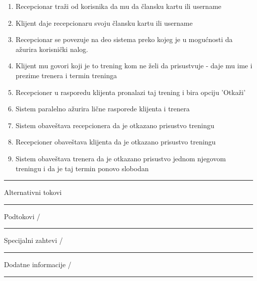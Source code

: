 \begin{center}
\begin{enumerate}
    \item Recepcionar traži od korisnika da mu da člansku kartu ili username
    \item Klijent daje recepcionaru svoju člansku kartu ili username
    \item Recepcionar se povezuje na deo sistema preko kojeg je u mogućnosti da ažurira korisnički nalog.
    \item Klijent mu govori koji je to trening kom ne želi da prisustvuje - daje mu ime i prezime trenera i termin treninga
    \item Recepcioner u rasporedu klijenta pronalazi taj trening i bira opciju 'Otkaži' 
    \item Sistem paralelno ažurira lične rasporede klijenta i trenera
    \item Sistem obaveštava recepcionera da je otkazano prisustvo treningu
    \item Recepcioner obaveštava klijenta da je otkazano prisustvo treningu
    \item Sistem obaveštava trenera da je otkazano prisustvo jednom njegovom treningu i da je taj termin ponovo slobodan
   \end{enumerate}
\hrule
\vspace{0.2cm}
    Alternativni tokovi  \\
\hrule
\vspace{0.2cm}
    Podtokovi  /\\
\hrule
\vspace{0.2cm}
    Specijalni zahtevi  /\\
\hrule
\vspace{0.2cm}
    Dodatne informacije  /\\
\hrule
\vspace{0.2cm}
    
    
    
\end{center}